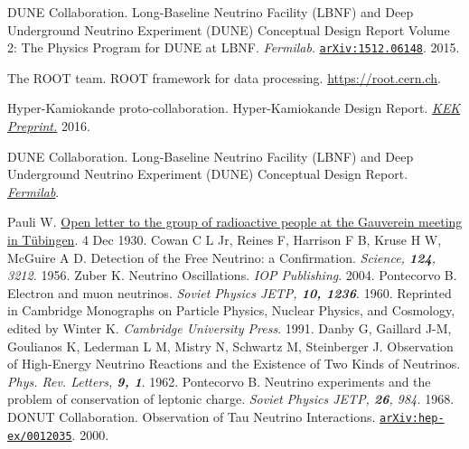 \begin{thebibliography}{100}


	 DUNE Collaboration. Long-Baseline Neutrino Facility (LBNF) and
		Deep Underground Neutrino Experiment (DUNE) Conceptual Design Report Volume
		2: The Physics Program for DUNE at LBNF. \textit{Fermilab}.
		\href{https://arxiv.org/abs/1512.06148}{\texttt{arXiv:1512.06148}}. 2015.

	 The ROOT team. ROOT framework for data processing.
		\url{https://root.cern.ch}.

	 Hyper-Kamiokande proto-collaboration. Hyper-Kamiokande
		Design Report. \href{http://www.hyperk.org/?p=215}{\textit{KEK Preprint.}}
		2016.

	DUNE Collaboration. Long-Baseline Neutrino Facility (LBNF) and
		Deep Underground Neutrino Experiment (DUNE) Conceptual Design Report.
		\href{https://web.fnal.gov/project/LBNF/ReviewsAndAssessments/LBNF_DUNE\%20DOE\%20CD-1\%20Refresh\%20Review/SitePages/Conceptual\%20Design\%20Report.aspx}{\textit{Fermilab}}.



	 Pauli W.
		\href{http://microboone-docdb.fnal.gov/cgi-bin/RetrieveFile?docid=953;filename=pauli\%20letter1930.pdf}{Open letter to the group of radioactive people at the 
Gauverein meeting in Tübingen}. 4 Dec 1930.
	 Cowan C L Jr, Reines F, Harrison F B, Kruse H W, McGuire A D.
		Detection of the Free Neutrino: a Confirmation. \textit{Science,
		\textbf{124}, 3212.} 1956.
	 Zuber K. Neutrino
		Oscillations. \textit{IOP Publishing}. 2004.
	 Pontecorvo B. Electron and muon neutrinos.
		\textit{Soviet Physics JETP, \bf{10}, 1236}. 1960. Reprinted in
		Cambridge Monographs on Particle Physics, Nuclear Physics, and Cosmology,
		edited by Winter K. \textit{Cambridge University Press}. 1991.
	 Danby G, Gaillard J-M, Goulianos K, Lederman L M, Mistry N,
		Schwartz M, Steinberger J. Observation of High-Energy Neutrino Reactions
		and the Existence of Two Kinds of Neutrinos. \textit{Phys. Rev. Letters,
		\bf{9}, 1}. 1962.
	 Pontecorvo B. Neutrino experiments and the problem of
		conservation of leptonic charge. \textit{Soviet Physics JETP, \textbf{26},
		984.} 1968.
	 DONUT Collaboration. Observation of Tau Neutrino
		Interactions.
		\href{https://arxiv.org/abs/hep-ex/0012035}{\texttt{arXiv:hep-ex/0012035}}.
		2000.


\end{thebibliography}
